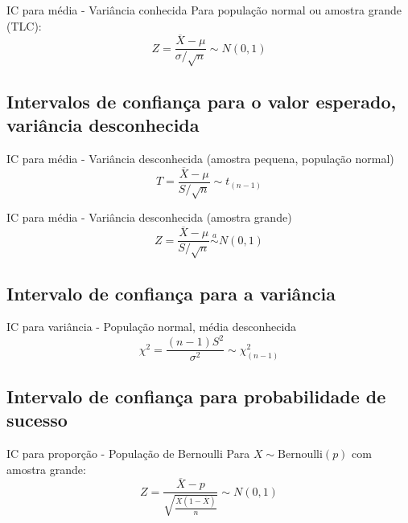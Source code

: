 \documentclass[a4paper,12pt]{article}
\begin{document}
\begin{formulabox}{IC para média - Variância conhecida}
Para população normal ou amostra grande (TLC):
\begin{equation}\label{formula24}\tag{Fórmula 24}
    Z = \frac{\overline{X} - \mu}{\sigma/\sqrt{n}} \sim N(0,1)
\end{equation}
\end{formulabox}

\subsection{Intervalos de confiança para o valor esperado, variância desconhecida}

\begin{formulabox}{{IC para média - Variância desconhecida (amostra pequena, população normal)}}
\begin{equation}\label{formula25}\tag{Fórmula 25}
    T = \frac{\overline{X} - \mu}{S/\sqrt{n}} \sim t_{(n-1)}
\end{equation}
\end{formulabox}

\begin{formulabox}{IC para média - Variância desconhecida (amostra grande)}
\begin{equation}\label{formula26}\tag{Fórmula 26}
    Z = \frac{\overline{X} - \mu}{S/\sqrt{n}} \overset{a}{\sim} N(0,1)
\end{equation}
\end{formulabox}

\subsection{Intervalo de confiança para a variância}

\begin{formulabox}{{IC para variância - População normal, média desconhecida}}
\begin{equation}\label{formula27}\tag{Fórmula 27}
    \chi^2 = \frac{(n-1)S^2}{\sigma^2} \sim \chi^2_{(n-1)}
\end{equation}
\end{formulabox}

\subsection{Intervalo de confiança para probabilidade de sucesso}

\begin{formulabox}{IC para proporção - População de Bernoulli}
Para $X \sim \text{Bernoulli}(p)$ com amostra grande:
\begin{equation}\label{formula28}\tag{Fórmula 28}
    Z = \frac{\overline{X} - p}{\sqrt{\frac{\overline{X}(1-\overline{X})}{n}}} \sim N(0, 1)
\end{equation}
\end{formulabox}
\end{document}
